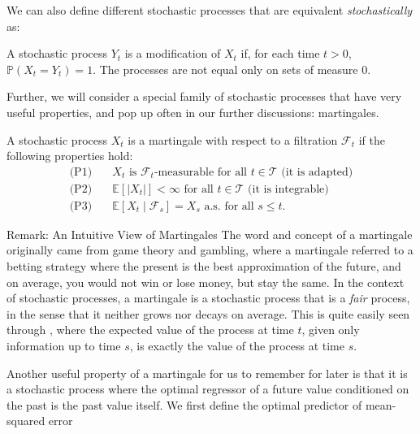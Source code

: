 We can also define different stochastic processes that are equivalent \emph{stochastically} as:
\begin{definition}
    A stochastic process $Y_t$ is a modification of $X_t$ if, for each time $t > 0$, $\mathbb{P}(X_t = Y_t) = 1$. The processes are not equal only on sets of measure 0.
\end{definition}

Further, we will consider a special family of stochastic processes that have very useful properties, and pop up often in our further discussions: martingales. 

\begin{definition}[Martingale]
    A stochastic process $X_t$ is a martingale with respect to a filtration $\mathcal{F}_t$ if the following properties hold:
    \begin{subequations}
    \begin{align}
        \text{(P1)} \quad &X_t \text{ is } \mathcal{F}_t \text{-measurable for all } t \in \mathcal{T} \text{ (it is adapted)} \\
        \text{(P2)} \quad &\mathbb{E}\left[\left|X_t\right|\right]<\infty \text{ for all } t \in \mathcal{T} \text{ (it is integrable)} \label{eq:martingale_p2} \\
        \text{(P3)} \quad &\mathbb{E}\left[X_t \mid \mathcal{F}_s\right]=X_s \text{ a.s. for all } s \leq t. \label{eq:martingale_p3}
    \end{align}
    \end{subequations}
\end{definition}

\begin{lightgraybox}{Remark: An Intuitive View of Martingales}
    The word and concept of a martingale originally came from game theory and gambling, where a martingale referred to a betting strategy where the present is the best approximation of the future, and on average, you would not win or lose money, but stay the same. In the context of stochastic processes, a martingale is a stochastic process that is a \emph{fair} process, in the sense that it neither grows nor decays on average. This is quite easily seen through , where the expected value of the process at time $t$, given only information up to time $s$, is exactly the value of the process at time $s$.
\end{lightgraybox}

Another useful property of a martingale for us to remember for later is that it is a stochastic process where the optimal regressor of a future value conditioned on the past is the past value itself. We first define the optimal predictor of mean-squared error

